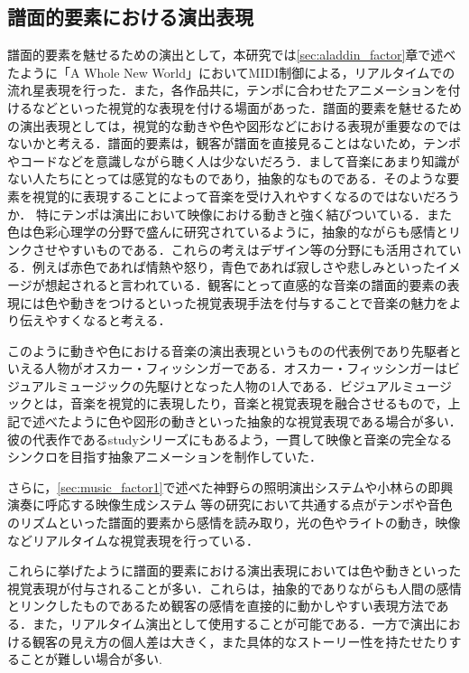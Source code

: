 \subsection{譜面的要素における演出表現}
譜面的要素を魅せるための演出として，本研究では\ref{sec:aladdin_factor}章で述べたように「A Whole New World」においてMIDI制御による，リアルタイムでの流れ星表現を行った．また，各作品共に，テンポに合わせたアニメーションを付けるなどといった視覚的な表現を付ける場面があった．譜面的要素を魅せるための演出表現としては，視覚的な動きや色や図形などにおける表現が重要なのではないかと考える．譜面的要素は，観客が譜面を直接見ることはないため，テンポやコードなどを意識しながら聴く人は少ないだろう．まして音楽にあまり知識がない人たちにとっては感覚的なものであり，抽象的なものである．そのような要素を視覚的に表現することによって音楽を受け入れやすくなるのではないだろうか．
特にテンポは演出において映像における動きと強く結びついている．また色は色彩心理学の分野で盛んに研究されているように，抽象的ながらも感情とリンクさせやすいものである．これらの考えはデザイン等の分野にも活用されている．例えば赤色であれば情熱や怒り，青色であれば寂しさや悲しみといったイメージが想起されると言われている．観客にとって直感的な音楽の譜面的要素の表現には色や動きをつけるといった視覚表現手法を付与することで音楽の魅力をより伝えやすくなると考える．

このように動きや色における音楽の演出表現というものの代表例であり先駆者といえる人物がオスカー・フィッシンガー\cite{Osukafisshinga2023}である．オスカー・フィッシンガーはビジュアルミュージックの先駆けとなった人物の1人である．ビジュアルミュージックとは，音楽を視覚的に表現したり，音楽と視覚表現を融合させるもので，上記で述べたように色や図形の動きといった抽象的な視覚表現である場合が多い．彼の代表作であるstudyシリーズにもあるよう，一貫して映像と音楽の完全なるシンクロを目指す抽象アニメーションを制作していた．

さらに，\ref{sec:music_factor1}で述べた神野らの照明演出システムや小林らの即興演奏に呼応する映像生成システム\cite{kobayashi}
等の研究において共通する点がテンポや音色のリズムといった譜面的要素から感情を読み取り，光の色やライトの動き，映像などリアルタイムな視覚表現を行っている．

これらに挙げたように譜面的要素における演出表現においては色や動きといった視覚表現が付与されることが多い．これらは，抽象的でありながらも人間の感情とリンクしたものであるため観客の感情を直接的に動かしやすい表現方法である．また，リアルタイム演出として使用することが可能である．一方で演出における観客の見え方の個人差は大きく，また具体的なストーリー性を持たせたりすることが難しい場合が多い.

